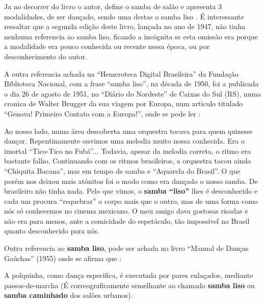 Ja no decorrer do livro o autor, define o samba de salão e apresenta 3 modalidades,
de ser dançado, sendo uma destas o samba liso \cite[pp. 61]{fornaciari1950aprender}.
É interessante ressaltar que a segunda edição deste livro, lançada no ano de 1947,
não tinha nenhuma referencia ao samba liso, ficando a incógnita se esta omissão era
porque a modalidade era pouco conhecida ou recente nessa época, ou por desconhecimento do autor.



A outra referencia achada na ``Hemeroteca Digital Brasileira'' da Fundação Biblioteca Nacional,
com a frase ``samba liso'', na década de 1950, foi a publicada o dia 26 de agosto de 1951,
no ``Diário do Nordeste'' de Caixas do Sul (RS), numa cronica de Walter Brugger da sua viagem por Europa,
num articulo titulado ``Genova! Primeiro Contato com a Europa!'',
onde se pode ler \cite[pp. 10]{nordestesambalisocronica}:
\begin{citando}
Ao nosso lado, numa área 
descoberta uma orquestra tocava para
quem quizesse dançar.
Repentinamente ouvimos uma melodia muito
nossa conhecida. Era o imortal ``Tico-Tico no Fubá''... Todavia,
apesar da melodia correta, o ritmo
era bastante falho. Continuando 
com os ritmos brasileiros, a orquestra 
tocou ainda ``Chiquita Bacana'',
mas em tempo de samba e ``Aquarela do Brasil''.
O que porém nos 
deixou mais atônitos foi o modo como 
era dançado o nosso samba. De 
brasileiro não tinha nada. Pelo que 
vimos, o \textbf{samba ``liso''} lhes é desconhecido 
e cada um procura ``requebrar'' o corpo mais que o outro,
mas de uma forma como nós só 
conhecemos no cinema mexicano. 
O meu amigo dava gostosas risadas e não era para menos,
ante a comicidade do espetáculo, tão 
impossível no Brasil quanto desconhecido para nós.
\end{citando}



Outra referencia ao \textbf{samba liso}, pode ser achada no livro ``Manual de Danças Gaúchas'' (1955)
onde se afirma que \cite[pp. 77]{cortesmanual}: 
\begin{citando}
A polquinha, como dança especifica, é executada por pares enlaçados,
mediante passos-de-marcha (É correograficamente  semelhante ao chamado 
\textbf{samba liso} ou \textbf{samba caminhado} dos salões urbanos).
\end{citando}~\\

